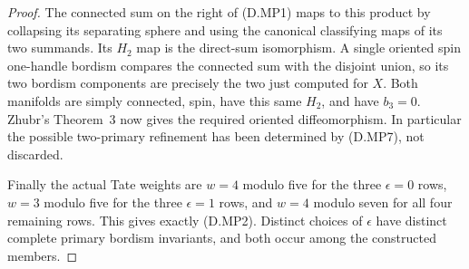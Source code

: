 \begin{proof}
The connected sum on the right of (D.MP1) maps to this product
by collapsing its separating sphere and using the canonical
classifying maps of its two summands. Its $H_2$ map is the
direct-sum isomorphism. A single oriented spin one-handle
bordism compares the connected sum with the disjoint union,
so its two bordism components are precisely the two just
computed for $X$. Both manifolds are simply connected, spin,
have this same $H_2$, and have $b_3=0$. Zhubr's Theorem~3
\cite[p.795]{manZhubr75} now gives the required oriented
diffeomorphism. In particular the possible two-primary
refinement has been determined by (D.MP7), not discarded.

Finally the actual Tate weights are $w=4$ modulo five for
the three $\epsilon=0$ rows, $w=3$ modulo five for the three
$\epsilon=1$ rows, and $w=4$ modulo seven for all four
remaining rows. This gives exactly (D.MP2). Distinct choices
of $\epsilon$ have distinct complete primary bordism
invariants, and both occur among the constructed members.
\end{proof}
